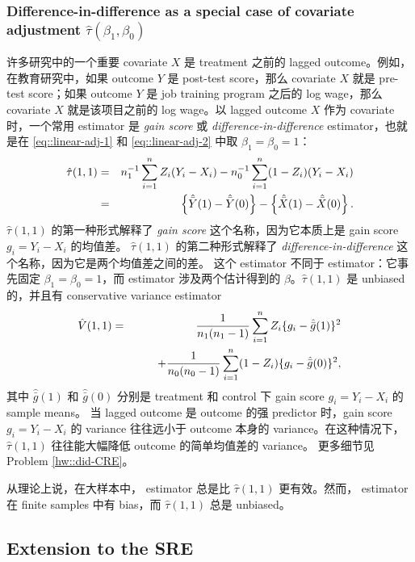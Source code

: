 \subsubsection{Difference-in-difference as a special case of covariate adjustment $\hat \tau(\beta_1, \beta_0)$}\label{sec::difference-in-difference-CRE}
许多研究中的一个重要 covariate $X$ 是 treatment 之前的 lagged outcome。例如，在教育研究中，如果 outcome $Y$ 是 post-test score，那么 covariate $X$ 就是 pre-test score；如果 outcome $Y$ 是 job training program 之后的 log wage，那么 covariate $X$ 就是该项目之前的 log wage。以 lagged outcome $X$ 作为 covariate 时，一个常用 estimator 是 {\it gain score} 或 {\it difference-in-difference} estimator，也就是在 \eqref{eq::linear-adj-1} 和 \eqref{eq::linear-adj-2} 中取 $\beta_1 = \beta_0=1$：
\begin{eqnarray*}
\hat{\tau}(1,1) &=& n_1^{-1} \sum_{i=1}^n Z_i(Y_i -   X_i) - n_0^{-1} \sum_{i=1}^n (1-Z_i) (Y_i -   X_i) \\
&=& \left\{   \hat{\bar{Y}}(1) - \hat{\bar{Y}}(0) \right\} -  \left\{   \hat{\bar{X} }(1) - \hat{\bar{X} }(0) \right\} .
\end{eqnarray*}
$\hat{\tau}(1,1) $ 的第一种形式解释了 {\it gain score} 这个名称，因为它本质上是 gain score $g_i = Y_i - X_i$ 的均值差。
$\hat{\tau}(1,1) $ 的第二种形式解释了 {\it difference-in-difference} 这个名称，因为它是两个均值差之间的差。
这个 estimator 不同于 \citet{lin2013} estimator：它事先固定 $\beta_1 = \beta_0=1$，而 \citet{lin2013} estimator 涉及两个估计得到的 $\beta$。$\hat{\tau}(1,1) $ 是 unbiased 的，并且有 conservative variance estimator
\begin{eqnarray*}
\hat{V}( 1,1 ) 
&=& \frac{1}{n_1(n_1 - 1)} \sum_{i=1}^n Z_i  \{ g_i - \hat{\bar{g}}(1)   \}^2 \\
& & \qquad + \frac{1}{n_0(n_0 - 1)} \sum_{i=1}^n (1-Z_i)  \{ g_i - \hat{\bar{g}}(0)   \}^2,
\end{eqnarray*}
其中 $\hat{\bar{g}}(1)$ 和 $ \hat{\bar{g}}(0)$ 分别是 treatment 和 control 下 gain score $g_i = Y_i - X_i$ 的 sample means。
当 lagged outcome 是 outcome 的强 predictor 时，gain score $g_i = Y_i - X_i$ 的 variance 往往远小于 outcome 本身的 variance。在这种情况下，$\hat{\tau}(1,1) $ 往往能大幅降低 outcome 的简单均值差的 variance。
更多细节见 Problem \ref{hw::did-CRE}。

从理论上说，在大样本中，\citet{lin2013} estimator 总是比 $\hat{\tau}(1,1)$ 更有效。然而，\citet{lin2013} estimator 在 finite samples 中有 bias，而 $\hat{\tau}(1,1)$ 总是 unbiased。

\subsection{Extension to the SRE}\label{sec::covariate-SRE}

